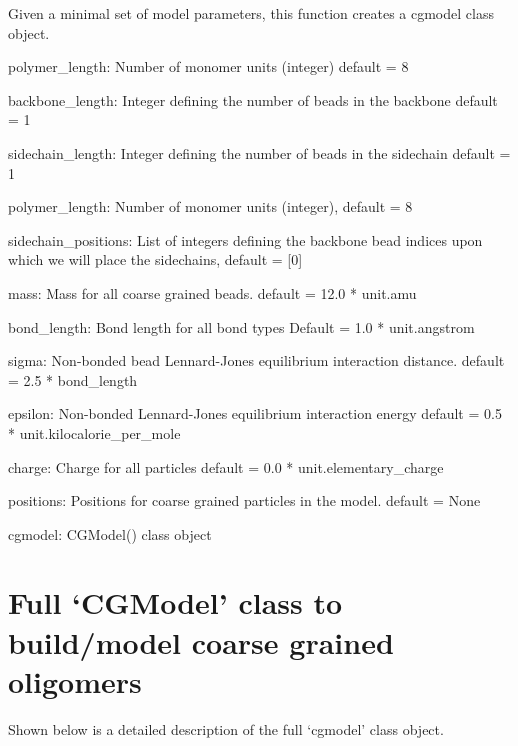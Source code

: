\documentclass[letterpaper,12pt,english,openany,oneside]{sphinxmanual}
\begin{document}
\begin{fulllineitems}
\label{\detokenize{cg_model:cg_model.cgmodel.basic_cgmodel}}
Given a minimal set of model parameters, this function creates a cgmodel class object.

polymer\_length: Number of monomer units (integer)
default = 8

backbone\_length: Integer defining the number of beads in the backbone
default = 1

sidechain\_length: Integer defining the number of beads in the sidechain
default = 1

polymer\_length: Number of monomer units (integer), default = 8

sidechain\_positions: List of integers defining the backbone
bead indices upon which we will place the sidechains,
default = {[}0{]}

mass: Mass for all coarse grained beads.
default = 12.0 * unit.amu

bond\_length: Bond length for all bond types
Default = 1.0 * unit.angstrom

sigma: Non-bonded bead Lennard-Jones equilibrium interaction distance.
default = 2.5 * bond\_length

epsilon: Non-bonded Lennard-Jones equilibrium interaction energy
default = 0.5 * unit.kilocalorie\_per\_mole

charge: Charge for all particles
default = 0.0 * unit.elementary\_charge

positions: Positions for coarse grained particles in the model.
default = None

cgmodel: CGModel() class object

\end{fulllineitems}



\section{Full ‘CGModel’ class to build/model coarse grained oligomers}
\label{\detokenize{cg_model:full-cgmodel-class-to-build-model-coarse-grained-oligomers}}
Shown below is a detailed description of the full ‘cgmodel’ class object.
\end{document}
